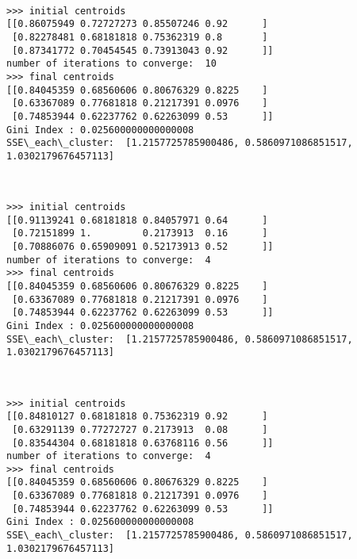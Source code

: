 \documentclass[11pt]{article}
\begin{document}
    \begin{center}
    \end{center}
    { \hspace*{\fill} \\}
    
    \begin{Verbatim}[commandchars=\\\{\}]
>>> initial centroids
[[0.86075949 0.72727273 0.85507246 0.92      ]
 [0.82278481 0.68181818 0.75362319 0.8       ]
 [0.87341772 0.70454545 0.73913043 0.92      ]]
number of iterations to converge:  10
>>> final centroids
[[0.84045359 0.68560606 0.80676329 0.8225    ]
 [0.63367089 0.77681818 0.21217391 0.0976    ]
 [0.74853944 0.62237762 0.62263099 0.53      ]]
Gini Index : 0.025600000000000008
SSE\_each\_cluster:  [1.2157725785900486, 0.5860971086851517, 1.0302179676457113]

    \end{Verbatim}

    \begin{center}
    \end{center}
    { \hspace*{\fill} \\}
    
    \begin{Verbatim}[commandchars=\\\{\}]
>>> initial centroids
[[0.91139241 0.68181818 0.84057971 0.64      ]
 [0.72151899 1.         0.2173913  0.16      ]
 [0.70886076 0.65909091 0.52173913 0.52      ]]
number of iterations to converge:  4
>>> final centroids
[[0.84045359 0.68560606 0.80676329 0.8225    ]
 [0.63367089 0.77681818 0.21217391 0.0976    ]
 [0.74853944 0.62237762 0.62263099 0.53      ]]
Gini Index : 0.025600000000000008
SSE\_each\_cluster:  [1.2157725785900486, 0.5860971086851517, 1.0302179676457113]

    \end{Verbatim}

    \begin{center}
    \end{center}
    { \hspace*{\fill} \\}
    
    \begin{Verbatim}[commandchars=\\\{\}]
>>> initial centroids
[[0.84810127 0.68181818 0.75362319 0.92      ]
 [0.63291139 0.77272727 0.2173913  0.08      ]
 [0.83544304 0.68181818 0.63768116 0.56      ]]
number of iterations to converge:  4
>>> final centroids
[[0.84045359 0.68560606 0.80676329 0.8225    ]
 [0.63367089 0.77681818 0.21217391 0.0976    ]
 [0.74853944 0.62237762 0.62263099 0.53      ]]
Gini Index : 0.025600000000000008
SSE\_each\_cluster:  [1.2157725785900486, 0.5860971086851517, 1.0302179676457113]

    \end{Verbatim}
\end{document}
